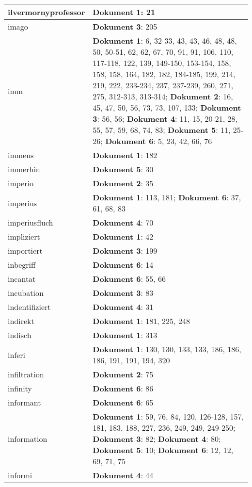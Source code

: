\documentclass[a5paper]{article}
\begin{document}
\begin{longtable}[l]{|l|p{3in}|}
\hline
ilvermornyprofessor & \textbf{Dokument 1}: 21 \\
\hline
imago & \textbf{Dokument 3}: 205 \\
\hline
imm & \textbf{Dokument 1}: 6, 32-33, 43, 43, 46, 48, 48, 50, 50-51, 62, 62, 67, 70, 91, 91, 106, 110, 117-118, 122, 139, 149-150, 153-154, 158, 158, 158, 164, 182, 182, 184-185, 199, 214, 219, 222, 233-234, 237, 237-239, 260, 271, 275, 312-313, 313-314; \textbf{Dokument 2}: 16, 45, 47, 50, 56, 73, 73, 107, 133; \textbf{Dokument 3}: 56, 56; \textbf{Dokument 4}: 11, 15, 20-21, 28, 55, 57, 59, 68, 74, 83; \textbf{Dokument 5}: 11, 25-26; \textbf{Dokument 6}: 5, 23, 42, 66, 76 \\
\hline
immens & \textbf{Dokument 1}: 182 \\
\hline
immerhin & \textbf{Dokument 5}: 30 \\
\hline
imperio & \textbf{Dokument 2}: 35 \\
\hline
imperius & \textbf{Dokument 1}: 113, 181; \textbf{Dokument 6}: 37, 61, 68, 83 \\
\hline
imperiusfluch & \textbf{Dokument 4}: 70 \\
\hline
impliziert & \textbf{Dokument 1}: 42 \\
\hline
importiert & \textbf{Dokument 3}: 199 \\
\hline
inbegriff & \textbf{Dokument 6}: 14 \\
\hline
incantat & \textbf{Dokument 6}: 55, 66 \\
\hline
incubation & \textbf{Dokument 3}: 83 \\
\hline
indentifiziert & \textbf{Dokument 4}: 31 \\
\hline
indirekt & \textbf{Dokument 1}: 181, 225, 248 \\
\hline
indisch & \textbf{Dokument 1}: 313 \\
\hline
inferi & \textbf{Dokument 1}: 130, 130, 133, 133, 186, 186, 186, 191, 191, 194, 320 \\
\hline
infiltration & \textbf{Dokument 2}: 75 \\
\hline
infinity & \textbf{Dokument 6}: 86 \\
\hline
informant & \textbf{Dokument 6}: 65 \\
\hline
information & \textbf{Dokument 1}: 59, 76, 84, 120, 126-128, 157, 181, 183, 188, 227, 236, 249, 249, 249-250; \textbf{Dokument 3}: 82; \textbf{Dokument 4}: 80; \textbf{Dokument 5}: 10; \textbf{Dokument 6}: 12, 12, 69, 71, 75 \\
\hline
informi & \textbf{Dokument 4}: 44 \\

\end{longtable}
\end{document}
